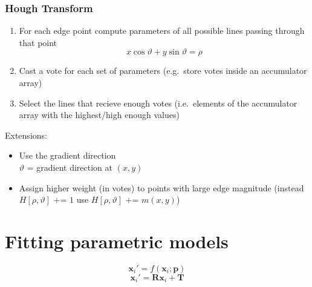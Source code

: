 \documentclass{article}
\begin{document}
        \subsubsection{Hough Transform}
        \begin{enumerate}
            \item For each edge point compute parameters of all possible lines passing through that point
            \[
                x \cos{\vartheta} + y \sin{\vartheta} = \rho
            \]
            \item Cast a vote for each set of parameters (e.g.\ store votes inside an accumulator array)
            \item Select the lines that recieve enough votes (i.e.\ elements of the accumulator array with the highest/high enough values)
        \end{enumerate}
        Extensions:
        \begin{itemize}
            \item Use the gradient direction \\
                  $\vartheta$ = gradient direction at $(x, y)$
            \item Assign higher weight (in votes) to points with large edge magnitude
                  (instead $H[\rho, \vartheta] \text{ += } 1$ use $H[\rho, \vartheta] \text{ += } m(x, y)$)
        \end{itemize}
        

    \newpage

\section{Fitting parametric models}
\[ \mathbf{x}_i' = f(\mathbf{x}_i ; \mathbf{p}) \]
\[ \mathbf{x}_i' = \mathbf{R} \mathbf{x}_i + \mathbf{T} \]
        
\end{document}
